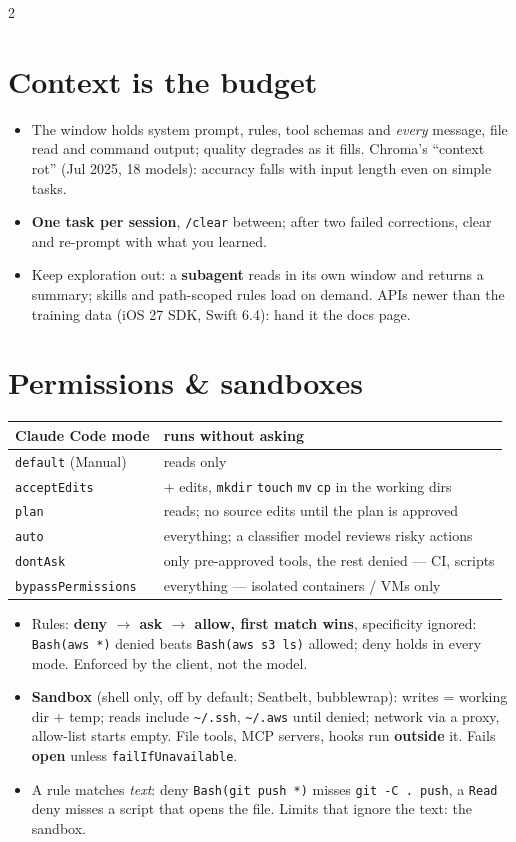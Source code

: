 \documentclass[8pt]{extarticle}
\newcommand\ct[1]{\texttt{#1}}
\newcommand\tld{\textasciitilde}
\begin{document}
\begin{multicols}{2}
\section{Context is the budget}
\begin{itemize}
  \item The window holds system prompt, rules, tool schemas and \emph{every} message, file read and
        command output; quality degrades as it fills. Chroma's ``context rot'' (Jul 2025, 18
        models): accuracy falls with input length even on simple tasks.
  \item \textbf{One task per session}, \ct{/clear} between; after two failed corrections, clear and
        re-prompt with what you learned.
  \item Keep exploration out: a \textbf{subagent} reads in its own window and returns a summary;
        skills and path-scoped rules load on demand. APIs newer than the training data (iOS 27
        SDK, Swift 6.4): hand it the docs page.
\end{itemize}

\section{Permissions \& sandboxes}
{\scriptsize\setlength{\tabcolsep}{2pt}
\begin{tabular}{@{}>{\raggedright\arraybackslash}p{19mm}>{\raggedright\arraybackslash}p{59mm}@{}}
\toprule
\textbf{Claude Code mode} & \textbf{runs without asking}\\
\midrule
\ct{default} (Manual) & reads only\\
\ct{acceptEdits} & + edits, \ct{mkdir} \ct{touch} \ct{mv} \ct{cp} in the working dirs\\
\ct{plan} & reads; no source edits until the plan is approved\\
\ct{auto} & everything; a classifier model reviews risky actions\\
\ct{dontAsk} & only pre-approved tools, the rest denied — CI, scripts\\
\ct{bypassPermissions} & everything — isolated containers / VMs only\\
\bottomrule
\end{tabular}}
\begin{itemize}
  \item Rules: \textbf{deny $\to$ ask $\to$ allow, first match wins}, specificity ignored:
        \ct{Bash(aws *)} denied beats \ct{Bash(aws s3 ls)} allowed; deny holds in every mode.
        Enforced by the client, not the model.
  \item \textbf{Sandbox} (shell only, off by default; Seatbelt, bubblewrap): writes = working dir +
        temp; reads include \ct{\tld/.ssh}, \ct{\tld/.aws} until denied; network via a proxy,
        allow-list starts empty. File tools, MCP servers, hooks run \textbf{outside} it. Fails
        \textbf{open} unless \ct{failIfUnavailable}.
  \item A rule matches \emph{text}: deny \ct{Bash(git push *)} misses \ct{git -C . push}, a \ct{Read}
        deny misses a script that opens the file. Limits that ignore the text: the sandbox.
\end{itemize}


\end{multicols}
\end{document}
